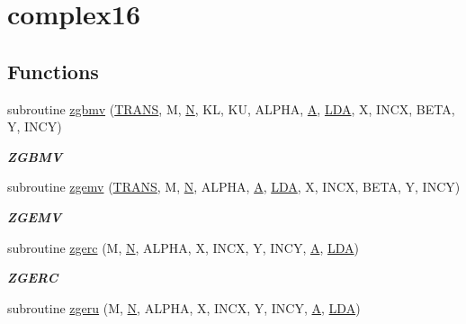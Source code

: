 \hypertarget{group__complex16__blas__level2}{}\section{complex16}
\label{group__complex16__blas__level2}
\subsection*{Functions}
\begin{DoxyCompactItemize}
\item 
subroutine \hyperlink{group__complex16__blas__level2_gab289624f8fdc44e20c5ab79f9cc1f631}{zgbmv} (\hyperlink{superlu__enum__consts_8h_a0c4e17b2d5cea33f9991ccc6a6678d62a1f61e3015bfe0f0c2c3fda4c5a0cdf58}{T\+R\+A\+N\+S}, M, \hyperlink{polmisc_8c_a0240ac851181b84ac374872dc5434ee4}{N}, K\+L, K\+U, A\+L\+P\+H\+A, \hyperlink{classA}{A}, \hyperlink{example__user_8c_ae946da542ce0db94dced19b2ecefd1aa}{L\+D\+A}, X, I\+N\+C\+X, B\+E\+T\+A, Y, I\+N\+C\+Y)
\begin{DoxyCompactList}\small\item\em {\bfseries Z\+G\+B\+M\+V} \end{DoxyCompactList}\item 
subroutine \hyperlink{group__complex16__blas__level2_gafaeb2abd9fffa7442b938dc384aeaf47}{zgemv} (\hyperlink{superlu__enum__consts_8h_a0c4e17b2d5cea33f9991ccc6a6678d62a1f61e3015bfe0f0c2c3fda4c5a0cdf58}{T\+R\+A\+N\+S}, M, \hyperlink{polmisc_8c_a0240ac851181b84ac374872dc5434ee4}{N}, A\+L\+P\+H\+A, \hyperlink{classA}{A}, \hyperlink{example__user_8c_ae946da542ce0db94dced19b2ecefd1aa}{L\+D\+A}, X, I\+N\+C\+X, B\+E\+T\+A, Y, I\+N\+C\+Y)
\begin{DoxyCompactList}\small\item\em {\bfseries Z\+G\+E\+M\+V} \end{DoxyCompactList}\item 
subroutine \hyperlink{group__complex16__blas__level2_ga88dcc222d4bdf735fb9ff1bdbb0d8f82}{zgerc} (M, \hyperlink{polmisc_8c_a0240ac851181b84ac374872dc5434ee4}{N}, A\+L\+P\+H\+A, X, I\+N\+C\+X, Y, I\+N\+C\+Y, \hyperlink{classA}{A}, \hyperlink{example__user_8c_ae946da542ce0db94dced19b2ecefd1aa}{L\+D\+A})
\begin{DoxyCompactList}\small\item\em {\bfseries Z\+G\+E\+R\+C} \end{DoxyCompactList}\item 
subroutine \hyperlink{group__complex16__blas__level2_ga7d9c75aa8d9865d271db9ced1d08d097}{zgeru} (M, \hyperlink{polmisc_8c_a0240ac851181b84ac374872dc5434ee4}{N}, A\+L\+P\+H\+A, X, I\+N\+C\+X, Y, I\+N\+C\+Y, \hyperlink{classA}{A}, \hyperlink{example__user_8c_ae946da542ce0db94dced19b2ecefd1aa}{L\+D\+A})

\end{DoxyCompactItemize}
